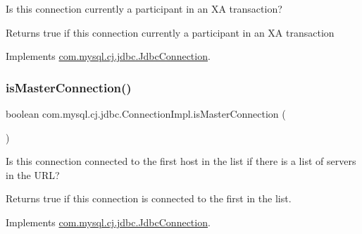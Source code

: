 Is this connection currently a participant in an XA transaction?

\begin{DoxyReturn}{Returns}
true if this connection currently a participant in an XA transaction 
\end{DoxyReturn}


Implements \mbox{\hyperlink{interfacecom_1_1mysql_1_1cj_1_1jdbc_1_1_jdbc_connection_a919152df37a4bf60c12c0818256a90a3}{com.\+mysql.\+cj.\+jdbc.\+Jdbc\+Connection}}.

\mbox{\label{classcom_1_1mysql_1_1cj_1_1jdbc_1_1_connection_impl_a5ba146293ff6812bf52d5baf61f66e02}} 
\subsubsection{\texorpdfstring{is\+Master\+Connection()}{isMasterConnection()}}
{\footnotesize\ttfamily boolean com.\+mysql.\+cj.\+jdbc.\+Connection\+Impl.\+is\+Master\+Connection (\begin{DoxyParamCaption}{ }\end{DoxyParamCaption})}

Is this connection connected to the first host in the list if there is a list of servers in the U\+RL?

\begin{DoxyReturn}{Returns}
true if this connection is connected to the first in the list. 
\end{DoxyReturn}


Implements \mbox{\hyperlink{interfacecom_1_1mysql_1_1cj_1_1jdbc_1_1_jdbc_connection_a012dc133872dd4d6db6d6f98118d3251}{com.\+mysql.\+cj.\+jdbc.\+Jdbc\+Connection}}.

\mbox{\label{classcom_1_1mysql_1_1cj_1_1jdbc_1_1_connection_impl_aedabb7228489905f7f53a433e5597133}} 
